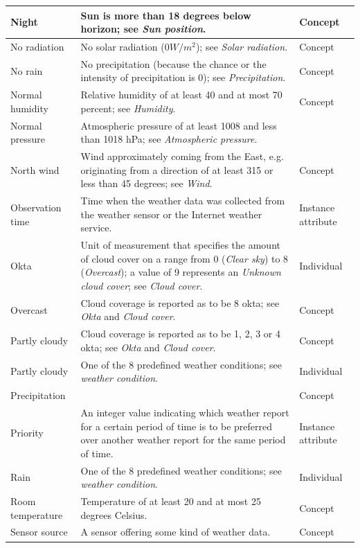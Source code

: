 \begin{longtable}{|p{}|p{}|p{}|}
  \hline
  Night & Sun is more than 18 degrees below horizon; see \emph{Sun position}. & Concept \\
  \hline
  No radiation & No solar radiation ($0 W/m^2$); see \emph{Solar radiation}. & Concept \\
  \hline
  No rain & No precipitation (because the chance or the intensity of precipitation is 0); see \emph{Precipitation}. & Concept \\
  \hline
  Normal humidity & Relative humidity of at least 40 and at most 70 percent; see \emph{Humidity}. & Concept \\
  \hline
  Normal pressure & Atmospheric pressure of at least 1008 and less than 1018 hPa; see \emph{Atmospheric pressure}.& \\
  \hline
  North wind & Wind approximately coming from the East, e.g. originating from a direction of at least 315 or less than 45 degrees; see \emph{Wind}. & Concept \\
  \hline
  Observation time & Time when the weather data was collected from the weather sensor or the Internet weather service. & Instance attribute \\
  \hline
  Okta & Unit of measurement that specifies the amount of cloud cover on a range from 0 (\emph{Clear sky}) to 8 (\emph{Overcast}); a value of 9 represents an \emph{Unknown cloud cover}; see \emph{Cloud cover}. & Individual \\ %
  \hline
  Overcast & Cloud coverage is reported as to be 8 okta; see \emph{Okta} and \emph{Cloud cover}. & Concept \\
  \hline
  Partly cloudy & Cloud coverage is reported as to be 1, 2, 3 or 4 okta; see \emph{Okta} and \emph{Cloud cover}. & Concept \\
  \hline
  Partly cloudy & One of the 8 predefined weather conditions; see \emph{weather condition}. & Individual \\
  \hline
  Precipitation & & Concept \\ %
  \hline
  Priority & An integer value indicating which weather report for a certain period of time is to be preferred over another weather report for the same period of time. & Instance attribute \\
  \hline
  Rain & One of the 8 predefined weather conditions; see \emph{weather condition}. & Individual \\
  \hline
  Room temperature & Temperature of at least 20 and at most 25 degrees Celsius. & Concept \\
  \hline
  Sensor source & A sensor offering some kind of weather data. & Concept \\

\end{longtable}
